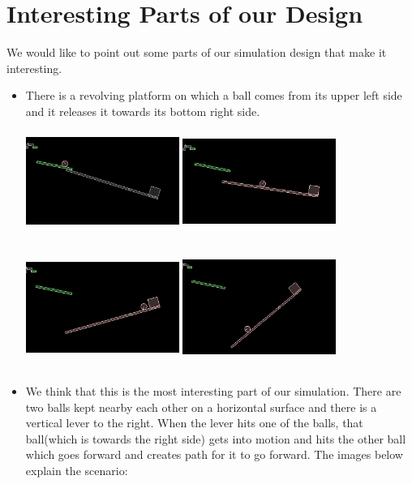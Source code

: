 \documentclass[english]{article}
\begin{document}
\section{Interesting Parts of our Design}
We would like to point out some parts of our simulation design that make it interesting.~\cite{hcv} ~\cite{hrw}
\begin{itemize}
\item There is a revolving platform on which a ball comes from its upper left side and it releases it towards its bottom right side.
\newline
\includegraphics[width=5cm, height=4cm]{doc/s1.png}
\includegraphics[width=5cm, height=4cm]{doc/s2.png}
\includegraphics[width=5cm, height=4cm]{doc/s3.png}
\includegraphics[width=5cm, height=4cm]{doc/s4.png}
\newline
\item We think that this is the most interesting part of our simulation. There are two balls kept nearby each other on a horizontal surface and there is a vertical lever to the right. When the lever hits one of the balls, that ball(which is towards the right side) gets into motion and hits the other ball which goes forward and creates path for it to go forward. The images below explain the scenario:

\end{itemize}
\end{document}
